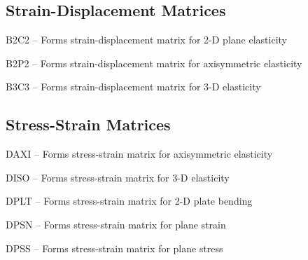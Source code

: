 \subsection*{Strain-Displacement Matrices}  %
\begin{list}{}{\leftmargin=57pt }
\item[B2C2 \hfill]   -- Forms strain-displacement matrix for 2-D plane elasticity
\item[B2P2 \hfill]   -- Forms strain-displacement matrix for axisymmetric elasticity
\item[B3C3 \hfill]   -- Forms strain-displacement matrix for 3-D elasticity
\end{list}
\subsection*{Stress-Strain Matrices}   %
\begin{list}{}{\leftmargin=57pt }
\item[DAXI \hfill]   -- Forms stress-strain matrix for axisymmetric elasticity
\item[DISO \hfill]   -- Forms stress-strain matrix for 3-D elasticity
\item[DPLT \hfill]   -- Forms stress-strain matrix for 2-D plate bending
\item[DPSN \hfill]   -- Forms stress-strain matrix for plane strain
\item[DPSS \hfill]   -- Forms stress-strain matrix for plane stress
\end{list}
